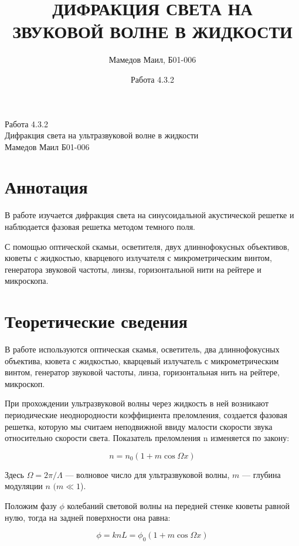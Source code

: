 \documentclass[a4paper,12pt]{article}
\title{ДИФРАКЦИЯ СВЕТА НА ЗВУКОВОЙ ВОЛНЕ В ЖИДКОСТИ}
\date{Работа 4.3.2}
\author{Мамедов Маил, Б01-006}
\begin{document}
	\begin{center}
		\LARGE{Работа 4.3.2}\\[0.2cm]
		\LARGE{Дифракция света на ультразвуковой волне в жидкости}\\[0.2cm]
		\large{Мамедов Маил Б01-006}\\[0.2cm]
	\end{center}  
	
	
	\section{Аннотация}
	
	В работе изучается дифракция света на синусоидальной акустической решетке и наблюдается фазовая решетка методом темного поля.
	
	С помощью оптической скамьи, осветителя, двух длиннофокусных объективов, кюветы с жидкостью, кварцевого излучателя с микрометрическим винтом, генератора звуковой частоты, линзы, горизонтальной нити на рейтере и микроскопа.
	
	
	\section{Теоретические сведения}
	
	В работе используются оптическая скамья, осветитель, два длиннофокусных объектива, кювета с жидкостью, кварцевый излучатель с микрометрическим винтом, генератор звуковой частоты, линза, горизонтальная нить на рейтере, микроскоп. 
	
	При прохождении ультразвуковой волны через жидкость в ней возникают периодические неоднородности коэффициента преломления, создается фазовая решетка, которую мы считаем неподвижной ввиду малости скорости звука относительно скорости света. Показатель
	преломления n изменяется по закону:
	
	\begin{equation}\label{}
		n = n_0 (1 + m \cos \Omega x)
	\end{equation}
	
	Здесь $ \Omega = 2 \pi / \Lambda $ --- волновое число для ультразвуковой волны, $ m $ --- глубина модуляции $ n $ $ (m \ll 1 $).
	
	Положим фазу $ \phi $ колебаний световой волны на передней стенке кюветы равной нулю, тогда на задней поверхности она равна:
	
	\begin{equation}\label{}
		\phi  = k n L = \phi_0 (1 + m \cos \Omega x)
	\end{equation}
	
\end{document}
